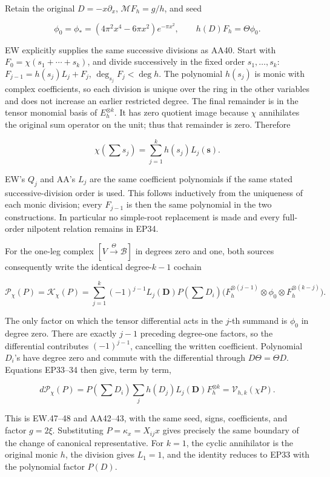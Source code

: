 Retain the original \(D=-x\partial_x\), \(\mathcal MF_h=g/h\), and seed

\[
\phi_0=\phi_*=(4\pi^2x^4-6\pi x^2)e^{-\pi x^2},\qquad
h(D)F_h=\Theta\phi_0.
\tag{EP33}
\]

EW explicitly supplies the same successive divisions as AA40. Start with \(F_0=\chi(s_1+\cdots+s_k)\), and divide successively in the fixed order \(s_1,\ldots,s_k\): \(F_{j-1}=h(s_j)L_j+F_j\), \(\deg_{s_j}F_j<\deg h\). The polynomial \(h(s_j)\) is monic with complex coefficients, so each division is unique over the ring in the other variables and does not increase an earlier restricted degree. The final remainder is in the tensor monomial basis of \(E_h^{\otimes k}\). It has zero quotient image because \(\chi\) annihilates the original sum operator on the unit; thus that remainder is zero. Therefore

\[
\chi(\textstyle\sum s_j)=\sum_{j=1}^k h(s_j)L_j(\mathbf s).
\tag{EP34}
\]

EW's \(Q_j\) and AA's \(L_j\) are the same coefficient polynomials if the same stated successive-division order is used. This follows inductively from the uniqueness of each monic division; every \(F_{j-1}\) is then the same polynomial in the two constructions. In particular no simple-root replacement is made and every full-order nilpotent relation remains in EP34.

For the one-leg complex \([V\xrightarrow{\Theta}\mathscr B]\) in degrees zero and one, both sources consequently write the identical degree-\(k-1\) cochain

\[
\mathcal P_\chi(P)=\mathcal K_\chi(P)
=\sum_{j=1}^k(-1)^{j-1}L_j(\mathbf D)P(\textstyle\sum D_i)
\bigl(F_h^{\otimes(j-1)}\otimes\phi_0\otimes F_h^{\otimes(k-j)}\bigr).
\tag{EP35}
\]

The only factor on which the tensor differential acts in the \(j\)-th summand is \(\phi_0\) in degree zero. There are exactly \(j-1\) preceding degree-one factors, so the differential contributes \((-1)^{j-1}\), cancelling the written coefficient. Polynomial \(D_i\)'s have degree zero and commute with the differential through \(D\Theta=\Theta D\). Equations EP33--34 then give, term by term,

\[
d\mathcal P_\chi(P)
=P(\textstyle\sum D_i)\sum_jh(D_j)L_j(\mathbf D)F_h^{\otimes k}
=\mathcal V_{h,k}(\chi P).
\tag{EP36}
\]

This is EW.47--48 and AA42--43, with the same seed, signs, coefficients, and factor \(g=2\xi\). Substituting \(P=\kappa_x=X_{ij}x\) gives precisely the same boundary of the change of canonical representative. For \(k=1\), the cyclic annihilator is the original monic \(h\), the division gives \(L_1=1\), and the identity reduces to EP33 with the polynomial factor \(P(D)\).

